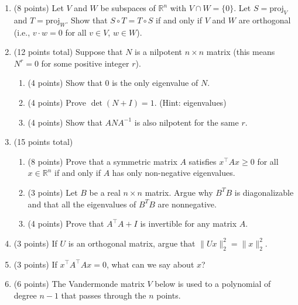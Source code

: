 \documentclass[12pt]{article}
\begin{document}
\begin{enumerate}
    
    \item (8 points) Let \( V \) and \( W \) be subspaces of \( \mathbb{R}^n \) with \( V \cap W = \{0\} \). Let \( S = \text{proj}_V \) and \( T = \text{proj}_W \). Show that \( S \circ T = T \circ S \) if and only if \( V \) and \( W \) are orthogonal (i.e., \( v \cdot w = 0 \) for all \( v \in V \), \( w \in W \)). 
    
    \item (12 points total) Suppose that \( N \) is a nilpotent \( n \times n \) matrix (this means \( N^r = 0 \) for some positive integer \( r \)).
    \begin{enumerate}
        \item (4 points) Show that \( 0 \) is the only eigenvalue of \( N \).
        \item (4 points) Prove $\det(N + I) = 1$. (Hint: eigenvalues)
        \item (4 points) Show that $ANA^{-1}$ is also nilpotent for the same $r$.
    \end{enumerate}

    \item (15 points total)
    \begin{enumerate}
        \item (8 points) Prove that a symmetric matrix \( A \) satisfies \( x^\top A x \geq 0 \) for all \( x \in \mathbb{R}^n \) if and only if \( A \) has only non-negative eigenvalues.
    
        \item (3 points) Let \( B \) be a real \( n \times n \) matrix. Argue why \( B^T B \) is diagonalizable and that all the eigenvalues of \( B^T B \) are nonnegative.

        \item (4 points) Prove that \( A^\top A + I \) is invertible for any matrix \( A \).
    \end{enumerate}

        
    
    \item (3 points) If \( U \) is an orthogonal matrix, argue that \( \| Ux \|_2^2 = \| x \|_2^2 \).
    
    \item (3 points) If \( x^\top A^\top A x = 0 \), what can we say about \( x \)?

        \item (6 points) The Vandermonde matrix $V$ below is used to a polynomial of degree $n-1$ that passes through the $n$ points. 


\end{enumerate}
\end{document}
